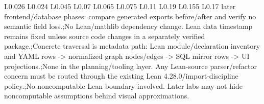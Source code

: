 \begin{longtable}{L{0.026\linewidth} L{0.024\linewidth} L{0.045\linewidth} L{0.07\linewidth} L{0.065\linewidth} L{0.075\linewidth} L{0.11\linewidth} L{0.19\linewidth} L{0.155\linewidth} L{0.17\linewidth}}
later frontend/\allowbreak{}database phases: compare generated exports before/\allowbreak{}after and verify no semantic field loss.;\newline No Lean/\allowbreak{}mathlib dependency change. Lean data timestamp remains fixed unless source code changes in a separately verified package.;\newline Concrete traversal is metadata path: Lean module/\allowbreak{}declaration inventory and YAML rows -> normalized graph nodes/\allowbreak{}edges -> SQL mirror rows -> UI projections.;\newline None in the planning/\allowbreak{}tooling layer. Any Lean-source parser/\allowbreak{}refactor concern must be routed through the existing Lean 4.28.0/\allowbreak{}import-discipline policy.;\newline No noncomputable Lean boundary involved. Later labs may not hide noncomputable assumptions behind visual approximations.\\
\hline
\addlinespace[0.24em]

\end{longtable}
